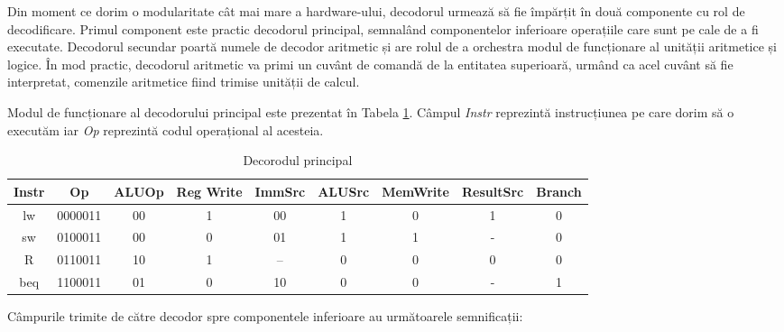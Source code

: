 \documentclass[12pt]{article}
\begin{document}
Din moment ce dorim o modularitate cât mai mare a hardware-ului, decodorul urmează să fie împărțit în două componente cu rol de decodificare. Primul component este practic decodorul principal, semnalând componentelor inferioare operațiile care sunt pe cale de a fi executate. Decodorul secundar poartă numele de decodor aritmetic și are rolul de a orchestra modul de funcționare al unității aritmetice și logice. În mod practic, decodorul aritmetic va primi un cuvânt de comandă de la entitatea superioară, urmând ca  acel cuvânt să fie interpretat, comenzile aritmetice fiind trimise unității de calcul.

Modul de funcționare al decodorului principal este prezentat în Tabela \ref{Tabela:16}. Câmpul \textit{Instr} reprezintă instrucțiunea pe care dorim să o executăm iar \textit{Op} reprezintă codul operațional al acesteia.

 \begin{table}[h]
\centering
\caption{Decorodul principal}
\label{Tabela:16}
\begin{tabular}{ ||c|c|c|c|c|c|c|c|c|| }
 \hline
 Instr & Op & ALUOp & Reg Write & ImmSrc & ALUSrc & MemWrite & ResultSrc & Branch \\ 
 \hline
 \hline
 lw & 0000011 & 00 & 1 & 00 & 1 & 0 & 1 & 0 \\
 \hline
 \hline
  sw & 0100011 & 00 & 0 & 01 & 1 & 1 & - & 0 \\
 \hline
 \hline
  R & 0110011 & 10 & 1 & -- & 0 & 0 & 0 & 0 \\
 \hline
 \hline
  beq & 1100011 & 01 & 0 & 10 & 0 & 0 & - & 1 \\
 \hline
\end{tabular}
\end{table}

Câmpurile trimite de către decodor spre componentele inferioare au următoarele semnificații:
\end{document}
